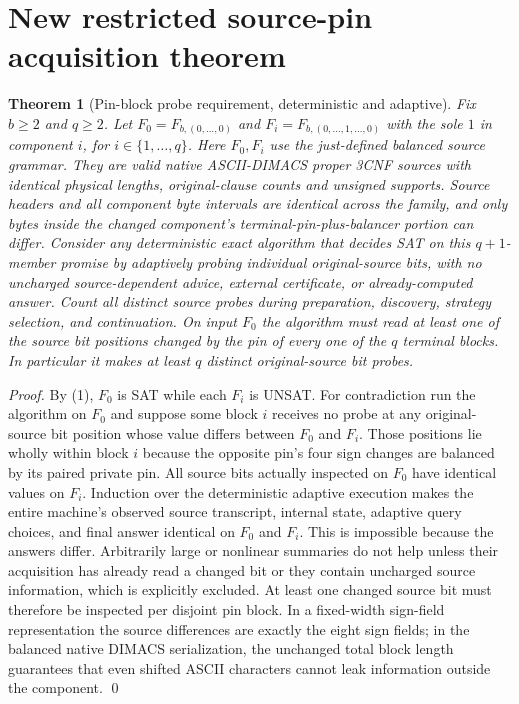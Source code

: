 \documentclass[11pt]{article}
\newtheorem{theorem}{Theorem}
\begin{document}
\section{New restricted source-pin acquisition theorem}
\begin{theorem}[Pin-block probe requirement, deterministic and adaptive]
Fix $b\ge2$ and $q\ge2$. Let $F_0=F_{b,(0,\ldots,0)}$ and $F_i=F_{b,(0,\ldots,1,\ldots,0)}$ with the sole $1$ in component $i$, for $i\in\{1,\ldots,q\}$. Here $F_0,F_i$ use the just-defined \emph{balanced} source grammar. They are valid native ASCII-DIMACS proper 3CNF sources with identical physical lengths, original-clause counts and unsigned supports. Source headers and all component byte intervals are identical across the family, and only bytes \emph{inside the changed component's terminal-pin-plus-balancer portion} can differ. Consider any deterministic exact algorithm that decides SAT on this $q+1$-member promise by adaptively probing individual original-source bits, with no uncharged source-dependent advice, external certificate, or already-computed answer. Count all distinct source probes during preparation, discovery, strategy selection, and continuation. On input $F_0$ the algorithm must read at least one of the source bit positions changed by the pin of \emph{every} one of the $q$ terminal blocks. In particular it makes at least $q$ distinct original-source bit probes.
\end{theorem}
\begin{proof}
By (1), $F_0$ is SAT while each $F_i$ is UNSAT. For contradiction run the algorithm on $F_0$ and suppose some block $i$ receives no probe at any original-source bit position whose value differs between $F_0$ and $F_i$. Those positions lie wholly within block $i$ because the opposite pin's four sign changes are balanced by its paired private pin. All source bits actually inspected on $F_0$ have identical values on $F_i$. Induction over the deterministic adaptive execution makes the entire machine's observed source transcript, internal state, adaptive query choices, and final answer identical on $F_0$ and $F_i$. This is impossible because the answers differ. Arbitrarily large or nonlinear summaries do not help unless their acquisition has already read a changed bit or they contain uncharged source information, which is explicitly excluded. At least one changed source bit must therefore be inspected per disjoint pin block. In a fixed-width sign-field representation the source differences are exactly the eight sign fields; in the balanced native DIMACS serialization, the unchanged total block length guarantees that even shifted ASCII characters cannot leak information outside the component. \qed
\end{proof}
\end{document}
